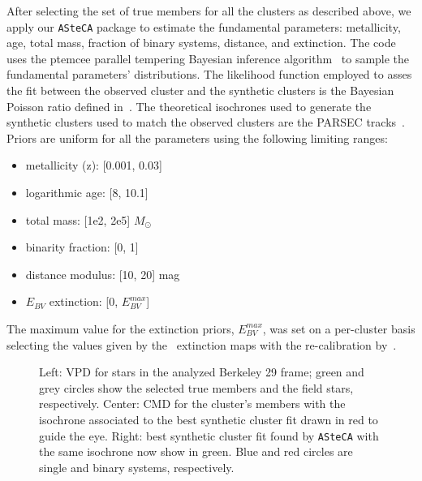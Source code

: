 \documentclass[referee]{aa}
\begin{document}
  After selecting the set of true members for all the clusters as described
  above, we apply our \texttt{ASteCA} package to estimate the fundamental
  parameters: metallicity, age, total mass, fraction of binary systems,
  distance, and extinction. The code uses the ptemcee parallel tempering
  Bayesian inference algorithm~\citep{ptemcee} to sample the fundamental
  parameters' distributions. The likelihood function employed to asses the fit
  between the observed cluster and the synthetic clusters is the Bayesian
  Poisson ratio defined in~\cite{Tremmel_2013}.
  The theoretical isochrones used to generate the
  synthetic clusters used to match the observed clusters are the PARSEC
  tracks~\citep{Bressan_2012}. Priors are uniform for all the parameters using
  the following limiting ranges:

  \begin{itemize}
   \item metallicity (z): [0.001, 0.03]
   \item logarithmic age: [8, 10.1]
   \item total mass: [1e2, 2e5] $M_{\odot}$
   \item binarity fraction: [0, 1]
   \item distance modulus: [10, 20] mag
   \item $E_{BV}$ extinction: [0, $E_{BV}^{max}$]
  \end{itemize}

  \noindent The maximum value for the extinction priors, $E_{BV}^{max}$, was set
  on a per-cluster basis selecting the values given by the~\cite{Schlegel_1998}
  extinction maps with the re-calibration by~\cite{Schlafly_2011}.

  \begin{figure}
   \caption{Left: VPD for stars in the analyzed Berkeley 29
    frame; green and grey circles show the selected true members and the field
    stars, respectively.
    Center: CMD for the cluster's members with the isochrone associated to the
    best synthetic cluster fit drawn in red to guide the eye.
    Right: best synthetic cluster fit found by \texttt{ASteCA} with the same
    isochrone now show in green. Blue and red circles are single and binary
    systems, respectively.}
   \label{fig:BER29_fpars}
  \end{figure}
\end{document}
